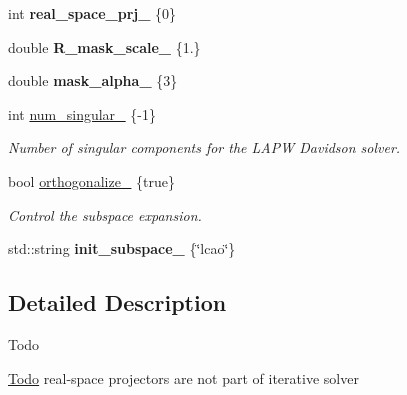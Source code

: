 \begin{DoxyCompactItemize}
\item 
\hypertarget{structsirius_1_1_iterative__solver__input__section_adca4e2201cd32863243ad1b9e6b1b147}{}int {\bfseries real\+\_\+space\+\_\+prj\+\_\+} \{0\}\label{structsirius_1_1_iterative__solver__input__section_adca4e2201cd32863243ad1b9e6b1b147}

\item 
\hypertarget{structsirius_1_1_iterative__solver__input__section_a34c0af52481120e5c3ec43f4db911bc6}{}double {\bfseries R\+\_\+mask\+\_\+scale\+\_\+} \{1.\}\label{structsirius_1_1_iterative__solver__input__section_a34c0af52481120e5c3ec43f4db911bc6}

\item 
\hypertarget{structsirius_1_1_iterative__solver__input__section_af01c54b9fe2506e633db1fb1a1b80019}{}double {\bfseries mask\+\_\+alpha\+\_\+} \{3\}\label{structsirius_1_1_iterative__solver__input__section_af01c54b9fe2506e633db1fb1a1b80019}

\item 
int \hyperlink{structsirius_1_1_iterative__solver__input__section_a93683d095b2fe257915b150fe540015e}{num\+\_\+singular\+\_\+} \{-\/1\}
\begin{DoxyCompactList}\small\item\em Number of singular components for the L\+A\+P\+W Davidson solver. \end{DoxyCompactList}\item 
bool \hyperlink{structsirius_1_1_iterative__solver__input__section_a8ac7b4092ce88a07adea0f746ee8e72d}{orthogonalize\+\_\+} \{true\}
\begin{DoxyCompactList}\small\item\em Control the subspace expansion. \end{DoxyCompactList}\item 
\hypertarget{structsirius_1_1_iterative__solver__input__section_a8bd73c33cb207140314ea5e54ec99ae2}{}std\+::string {\bfseries init\+\_\+subspace\+\_\+} \{\char`\"{}lcao\char`\"{}\}\label{structsirius_1_1_iterative__solver__input__section_a8bd73c33cb207140314ea5e54ec99ae2}

\end{DoxyCompactItemize}


\subsection{Detailed Description}
\begin{DoxyRefDesc}{Todo}
\item[\hyperlink{todo__todo000002}{Todo}]real-\/space projectors are not part of iterative solver \end{DoxyRefDesc}


